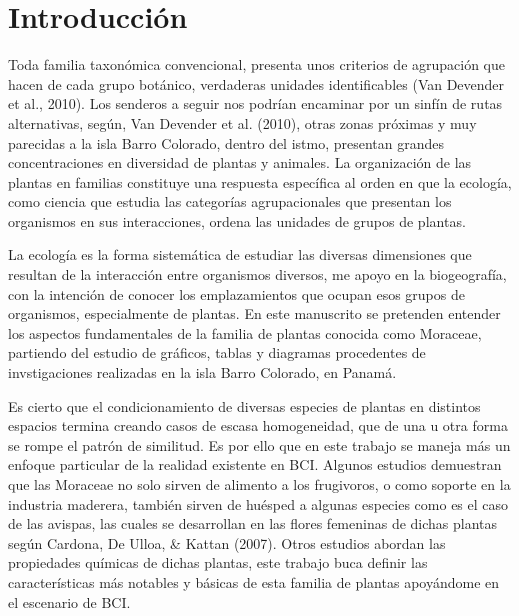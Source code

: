 \documentclass[11pt,]{article}
\begin{document}
\vskip 6.5pt


\noindent  \section{Introducción}\label{introducciuxf3n}

Toda familia taxonómica convencional, presenta unos criterios de
agrupación que hacen de cada grupo botánico, verdaderas unidades
identificables (Van Devender et al., 2010). Los senderos a seguir nos
podrían encaminar por un sinfín de rutas alternativas, según, Van
Devender et al. (2010), otras zonas próximas y muy parecidas a la isla
Barro Colorado, dentro del istmo, presentan grandes concentraciones en
diversidad de plantas y animales. La organización de las plantas en
familias constituye una respuesta específica al orden en que la
ecología, como ciencia que estudia las categorías agrupacionales que
presentan los organismos en sus interacciones, ordena las unidades de
grupos de plantas.

La ecología es la forma sistemática de estudiar las diversas dimensiones
que resultan de la interacción entre organismos diversos, me apoyo en la
biogeografía, con la intención de conocer los emplazamientos que ocupan
esos grupos de organismos, especialmente de plantas. En este manuscrito
se pretenden entender los aspectos fundamentales de la familia de
plantas conocida como Moraceae, partiendo del estudio de gráficos,
tablas y diagramas procedentes de invstigaciones realizadas en la isla
Barro Colorado, en Panamá.

Es cierto que el condicionamiento de diversas especies de plantas en
distintos espacios termina creando casos de escasa homogeneidad, que de
una u otra forma se rompe el patrón de similitud. Es por ello que en
este trabajo se maneja más un enfoque particular de la realidad
existente en BCI. Algunos estudios demuestran que las Moraceae no solo
sirven de alimento a los frugivoros, o como soporte en la industria
maderera, también sirven de huésped a algunas especies como es el caso
de las avispas, las cuales se desarrollan en las flores femeninas de
dichas plantas según Cardona, De Ulloa, \& Kattan (2007). Otros estudios
abordan las propiedades químicas de dichas plantas, este trabajo buca
definir las características más notables y básicas de esta familia de
plantas apoyándome en el escenario de BCI.
\end{document}
